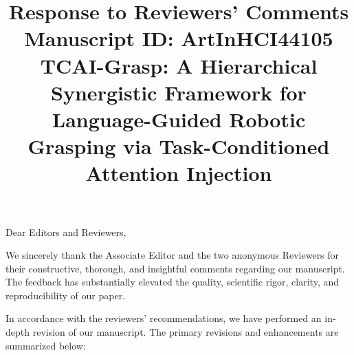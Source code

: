\documentclass[11pt]{article}
\title{\textbf{Response to Reviewers' Comments}\\\large Manuscript ID: ArtInHCI44105\\\textbf{TCAI-Grasp: A Hierarchical Synergistic Framework for Language-Guided Robotic Grasping via Task-Conditioned Attention Injection}}
\date{}
\begin{document}
\maketitle

\noindent Dear Editors and Reviewers,

\vspace{1ex}
\noindent We sincerely thank the Associate Editor and the two anonymous Reviewers for their constructive, thorough, and insightful comments regarding our manuscript. The feedback has substantially elevated the quality, scientific rigor, clarity, and reproducibility of our paper.

\vspace{1ex}
\noindent In accordance with the reviewers' recommendations, we have performed an in-depth revision of our manuscript. The primary revisions and enhancements are summarized below:
\end{document}
